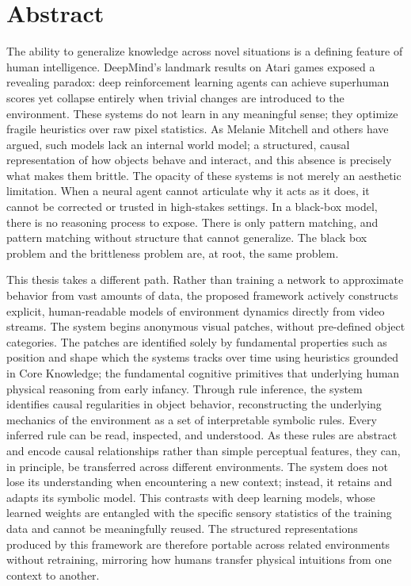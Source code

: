 \documentclass[12pt,a4paper]{report}
\begin{document}
\chapter*{Abstract}
The ability to generalize knowledge across novel situations is a defining feature of human intelligence. DeepMind's landmark results on Atari games exposed a revealing paradox: deep reinforcement learning agents can achieve superhuman scores yet collapse entirely when trivial changes are introduced to the environment. These systems do not learn in any meaningful sense; they optimize fragile heuristics over raw pixel statistics. As Melanie Mitchell and others have argued, such models lack an internal world model; a structured, causal representation of how objects behave and interact, and this absence is precisely what makes them brittle. The opacity of these systems is not merely an aesthetic limitation. When a neural agent cannot articulate why it acts as it does, it cannot be corrected or trusted in high-stakes settings. 
In a black-box model, there is no reasoning process to expose. There is only pattern matching, and pattern matching without structure that cannot generalize. The black box problem and the brittleness problem are, at root, the same problem.

This thesis takes a different path. Rather than training a network to approximate behavior from vast amounts of data, the proposed framework actively constructs explicit, human-readable models of environment dynamics directly from video streams. The system begins anonymous visual patches, without pre-defined object categories. The patches are identified solely by fundamental properties such as position and shape which the systems tracks over time using heuristics grounded in Core Knowledge; the fundamental cognitive primitives that underlying human physical reasoning from early infancy. 
Through rule inference, the system identifies causal regularities in object behavior, reconstructing the underlying mechanics of the environment as a set of interpretable symbolic rules. Every inferred rule can be read, inspected, and understood. 
As these rules are abstract and encode causal relationships rather than simple perceptual features, they can, in principle, be transferred across different environments. The system does not lose its understanding when encountering a new context; instead, it retains and adapts its symbolic model. This contrasts with deep learning models, whose learned weights are entangled with the specific sensory statistics of the training data and cannot be meaningfully reused. The structured representations produced by this framework are therefore portable across related environments without retraining, mirroring how humans transfer physical intuitions from one context to another. 
\end{document}
